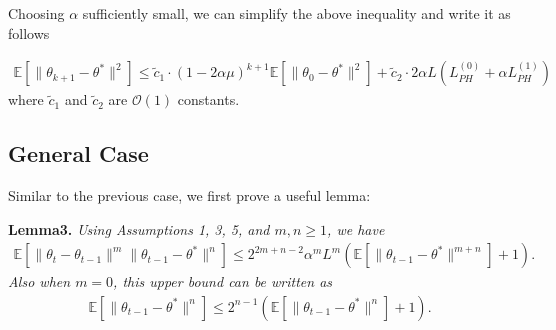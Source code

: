 \documentclass[a4paper]{article}
\newcommand{\norm}[1]{\|#1 \|}
\newcommand{\Exs}{\mathbb{E}}
\newcommand{\thetastar}{\theta^*}
\newcommand{\constLPH}[1]{L_{PH}^{(#1)}}
\newcommand{\stepsize}{\alpha}
\begin{document}
	Choosing $\stepsize$ sufficiently small, we can simplify the above inequality and write it as follows
	
	\begin{align*}
		\Exs\left[\norm{\theta_{k + 1} - \thetastar}^{2}\right] \leq \tilde{c}_{1} \cdot \left(1 - 2\stepsize \mu\right)^{k + 1}\Exs\left[\norm{\theta_{0} - \thetastar}^{2}\right] + \tilde{c}_{2} \cdot 2\stepsize L\left(\constLPH{0} + \stepsize\constLPH{1}\right)
	\end{align*}
	where $\tilde{c}_{1}$ and $\tilde{c}_{2}$ are $\mathcal{O}\left(1\right)$ constants.
	
	
	
	
	
	\subsection{General Case}
	Similar to the previous case, we first prove a useful lemma:
	
	\textbf{Lemma3.} \textit{Using Assumptions 1, 3, 5, and $m, n \ge 1$, we have
		\begin{align*}
			\Exs\left[\norm{\theta_{t} - \theta_{t - 1}}^{m}\norm{\theta_{t - 1} - \thetastar}^{n}\right] \leq 2^{2m + n - 2}\stepsize^{m}L^{m}\left(\Exs\left[\norm{\theta_{t - 1} - \thetastar}^{m + n}\right] + 1\right).
		\end{align*}
		Also when $m = 0$, this upper bound can be written as
		\begin{align}
			\Exs\left[\norm{\theta_{t - 1} - \thetastar}^{n}\right] \leq 2^{n - 1}\left(\Exs\left[\norm{\theta_{t - 1} - \thetastar}^{n}\right] + 1\right).
		\end{align}
	}
	
\end{document}
